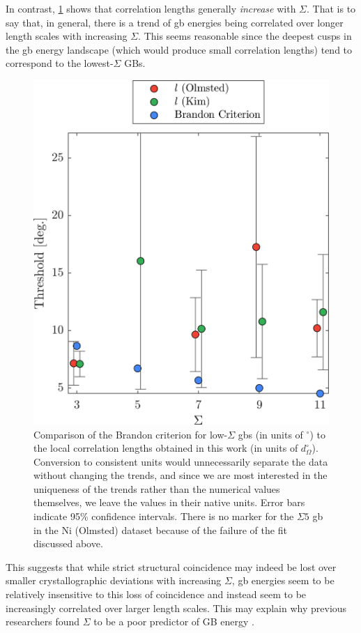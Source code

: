 \documentclass[final,twocolumn,12pt]{elsarticle}
\begin{document}
    In contrast, \cref{fig:brandoncriterioncomparison} shows that correlation lengths generally \emph{increase} with $\Sigma$. That is to say that, in general, there is a trend of \gls{gb} energies being correlated over longer length scales with increasing $\Sigma$. This seems reasonable since the deepest cusps in the \gls{gb} energy landscape (which would produce small correlation lengths) tend to correspond to the lowest-$\Sigma$ GBs.
    \begin{figure}
        \centering
        \includegraphics[scale=1]{figures/BrandonCriterionComparison.png}
        \caption{Comparison of the Brandon criterion \cite{brandonStructureHighangleGrain1966a} for low-$\Sigma$ \glspl{gb} (in units of ${}^{\circ}$) to the local correlation lengths obtained in this work (in units of \SI{}{\tobydeg} $d_{\Omega}^{\circ}$). Conversion to consistent units would unnecessarily separate the data without changing the trends, and since we are most interested in the uniqueness of the trends rather than the numerical values themselves, we leave the values in their native units. Error bars indicate 95\% confidence intervals. There is no marker for the $\Sigma 5$ \gls{gb} in the Ni (Olmsted) dataset because of the failure of the fit discussed above.}
        \label{fig:brandoncriterioncomparison}
    \end{figure}
    This suggests that while strict structural coincidence may indeed be lost over smaller crystallographic deviations with increasing $\Sigma$, \gls{gb} energies seem to be relatively insensitive to this loss of coincidence and instead seem to be increasingly correlated over larger length scales. This may explain why previous researchers found $\Sigma$ to be a poor predictor of GB energy \cite{olmstedSurveyComputedGrain2009a}.
\end{document}
